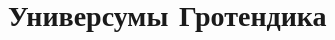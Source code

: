 \documentclass[
	extrafontsizes,
	11pt,
	hyphens,
]{memoir}
\begin{document}
%
%
%


\section{Универсумы Гротендика}
\end{document}
